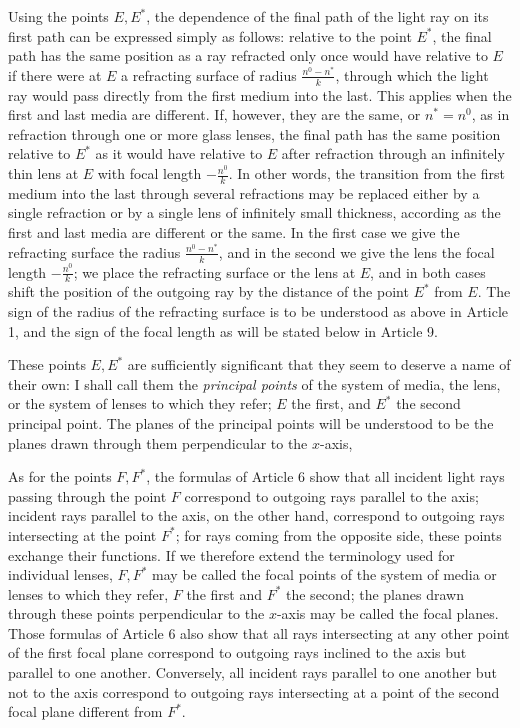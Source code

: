 Using the points $E,E^*$, the dependence of the final path of the light ray on its first path can be expressed simply as follows: relative to the point $E^*$, the final path has the same position as a ray refracted only once would have relative to $E$ if there were at $E$ a refracting surface of radius $\frac{n^0-n^*}{k}$, through which the light ray would pass directly from the first medium into the last. This applies when the first and last media are different. If, however, they are the same, or $n^*=n^0$, as in refraction through one or more glass lenses, the final path has the same position relative to $E^*$ as it would have relative to $E$ after refraction through an infinitely thin lens at $E$ with focal length $-\frac{n^0}k$. In other words, the transition from the first medium into the last through several refractions may be replaced either by a single refraction or by a single lens of infinitely small thickness, according as the first and last media are different or the same. In the first case we give the refracting surface the radius $\frac{n^0-n^*}{k}$, and in the second we give the lens the focal length $-\frac{n^0}k$; we place the refracting surface or the lens at $E$, and in both cases shift the position of the outgoing ray by the distance of the point $E^*$ from $E$. The sign of the radius of the refracting surface is to be understood as above in Article 1, and the sign of the focal length as will be stated below in Article 9.

These points $E,E^*$ are sufficiently significant that they seem to deserve a name of their own: I shall call them the \textit{principal points} of the system of media, the lens, or the system of lenses to which they refer; $E$ the first, and $E^*$ the second principal point. The planes of the principal points will be understood to be the planes drawn through them perpendicular to the $x$-axis,

As for the points $F,F^*$, the formulas of Article 6 show that all incident light rays passing through the point $F$ correspond to outgoing rays parallel to the axis; incident rays parallel to the axis, on the other hand, correspond to outgoing rays intersecting at the point $F^*$; for
rays coming from the opposite side, these points exchange their functions. If we therefore extend the terminology used for individual lenses, $F,F^*$ may be called the focal points of the system of media or lenses to which they refer, $F$ the first and $F^*$ the second; the planes drawn through these points perpendicular to the $x$-axis may be called the focal planes. Those formulas of Article 6 also show that all rays intersecting at any other point of the first focal plane correspond to outgoing rays inclined to the axis but parallel to one another. Conversely, all incident rays parallel to one another but not to the axis correspond to outgoing rays intersecting at a point of the second focal plane different from $F^*$.

